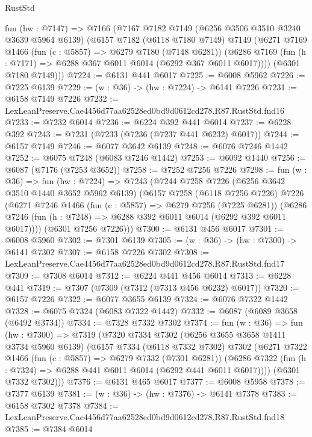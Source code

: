 \begin{lexlean}{RustStd}
\begin{coremodule}
{{  fun (hw : @7147) =>
  @7166
    (@7167
      @7182
      @7149
      (@6256 @3506 @3510 @3240 @3639 @5964 @6139)
      (@6157
        @7182
        (@6118 @7180 @7149)
        @7149
        (@6271
          @7169
          @1466
          (fun (c : @5857) => @6279 @7180 (@7148 @6281))
          (@6286 @7169 (fun (h : @7171) => @6288 @367 @6011 @6014 (@6292 @367 @6011 @6017))))
        (@6301 @7180 @7149)))
@7224 := @6131 @441 @6017
@7225 := @6008 @5962
@7226 := @7225 @6139
@7229 := (w : @36) -> (hw : @7224) -> @6141 @7226
@7231 := @6158 @7149 @7226
@7232 := LexLeanPreserve.Cae4456d77aa62528ed0bd9d0612cd278.R87.RustStd.fnd16
@7233 := @7232 @6014
@7236 := @6224 @392 @441 @6014
@7237 := @6228 @392
@7243 := @7231 (@7233 (@7236 (@7237 @441 @6232) @6017))
@7244 := @6157 @7149
@7246 := @6077 @3642 @6139
@7248 := @6076 @7246 @1442
@7252 := @6075 @7248 (@6083 @7246 @1442)
@7253 := @6092 @1440
@7256 := @6087 (@7176 (@7253 @3652))
@7258 := @7252 @7256 @7226
@7298 := fun (w : @36) =>
  fun (hw : @7224) =>
  @7243
    (@7244
      @7258
      @7226
      (@6256 @3642 @3510 @1440 @3652 @5962 @6139)
      (@6157
        @7258
        (@6118 @7256 @7226)
        @7226
        (@6271
          @7246
          @1466
          (fun (c : @5857) => @6279 @7256 (@7225 @6281))
          (@6286 @7246 (fun (h : @7248) => @6288 @392 @6011 @6014 (@6292 @392 @6011 @6017))))
        (@6301 @7256 @7226)))
@7300 := @6131 @456 @6017
@7301 := @6008 @5960
@7302 := @7301 @6139
@7305 := (w : @36) -> (hw : @7300) -> @6141 @7302
@7307 := @6158 @7226 @7302
@7308 := LexLeanPreserve.Cae4456d77aa62528ed0bd9d0612cd278.R87.RustStd.fnd17
@7309 := @7308 @6014
@7312 := @6224 @441 @456 @6014
@7313 := @6228 @441
@7319 := @7307 (@7309 (@7312 (@7313 @456 @6232) @6017))
@7320 := @6157 @7226
@7322 := @6077 @3655 @6139
@7324 := @6076 @7322 @1442
@7328 := @6075 @7324 (@6083 @7322 @1442)
@7332 := @6087 (@6089 @3658 (@6492 @3734))
@7334 := @7328 @7332 @7302
@7374 := fun (w : @36) =>
  fun (hw : @7300) =>
  @7319
    (@7320
      @7334
      @7302
      (@6256 @3655 @3658 @1411 @3734 @5960 @6139)
      (@6157
        @7334
        (@6118 @7332 @7302)
        @7302
        (@6271
          @7322
          @1466
          (fun (c : @5857) => @6279 @7332 (@7301 @6281))
          (@6286 @7322 (fun (h : @7324) => @6288 @441 @6011 @6014 (@6292 @441 @6011 @6017))))
        (@6301 @7332 @7302)))
@7376 := @6131 @465 @6017
@7377 := @6008 @5958
@7378 := @7377 @6139
@7381 := (w : @36) -> (hw : @7376) -> @6141 @7378
@7383 := @6158 @7302 @7378
@7384 := LexLeanPreserve.Cae4456d77aa62528ed0bd9d0612cd278.R87.RustStd.fnd18
@7385 := @7384 @6014
}}
\end{coremodule}
\end{lexlean}
